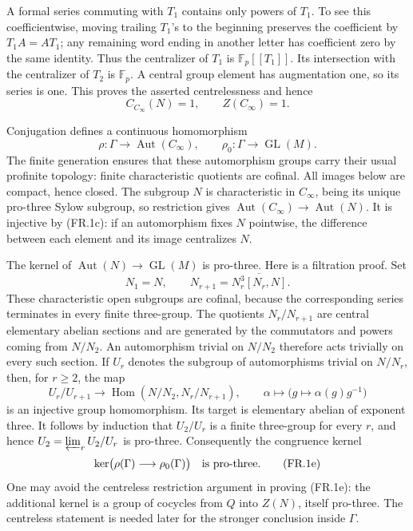 A formal series commuting with $T_1$ contains only powers
of $T_1$. To see this coefficientwise, moving trailing
$T_1$'s to the beginning preserves the coefficient by
$T_1A=AT_1$; any remaining word ending in another letter
has coefficient zero by the same identity. Thus the
centralizer of $T_1$ is $\mathbb F_p[[T_1]]$.
Its intersection with the centralizer of $T_2$ is
$\mathbb F_p$. A central group element has augmentation
one, so its series is one. This proves the asserted
centrelessness and hence
\[
           C_{C_\infty}(N)=1,
           \qquad Z(C_\infty)=1.
 \tag{FR.1c}
\]

Conjugation defines a continuous homomorphism
\[
 \rho:\Gamma\longrightarrow\operatorname{Aut}(C_\infty),
 \qquad \rho_0:\Gamma\longrightarrow\operatorname{GL}(M).
\]
The finite generation ensures that these automorphism groups
carry their usual profinite topology: finite characteristic
quotients are cofinal. All images below are compact, hence
closed. The subgroup $N$ is characteristic in $C_\infty$,
being its unique pro-three Sylow subgroup, so restriction gives
$\operatorname{Aut}(C_\infty)\to\operatorname{Aut}(N)$.
It is injective by (FR.1c): if an automorphism fixes $N$
pointwise, the difference between each element and its image
centralizes $N$.

The kernel of
$\operatorname{Aut}(N)\to\operatorname{GL}(M)$ is pro-three.
Here is a filtration proof. Set
\[
 N_1=N,\qquad N_{r+1}=\overline{N_r^3[N_r,N]}.
\]
These characteristic open subgroups are cofinal, because the
corresponding series terminates in every finite three-group.
The quotients $N_r/N_{r+1}$ are central elementary abelian
sections and are generated by the commutators and powers
coming from $N/N_2$. An automorphism trivial on $N/N_2$
therefore acts trivially on every such section. If $U_r$
denotes the subgroup of automorphisms trivial on $N/N_r$,
then, for $r\geq2$, the map
\[
 U_r/U_{r+1}\longrightarrow
 \operatorname{Hom}(N/N_2,N_r/N_{r+1}),\qquad
 \alpha\longmapsto\bigl(g\mapsto\alpha(g)g^{-1}\bigr)
 \tag{FR.1d}
\]
is an injective group homomorphism. Its target is elementary
abelian of exponent three. It follows by induction that
$U_2/U_r$ is a finite three-group for every $r$, and hence
$U_2=\varprojlim_rU_2/U_r$ is pro-three.
Consequently the congruence kernel
\[
 \ker\bigl(\rho(\Gamma)\longrightarrow\rho_0(\Gamma)\bigr)
                       \quad\hbox{is pro-three.}
 \tag{FR.1e}
\]
One may avoid the centreless restriction argument in proving
(FR.1e): the additional kernel is a group of cocycles from
$Q$ into $Z(N)$, itself pro-three. The centreless statement
is needed later for the stronger conclusion inside $\Gamma$.

